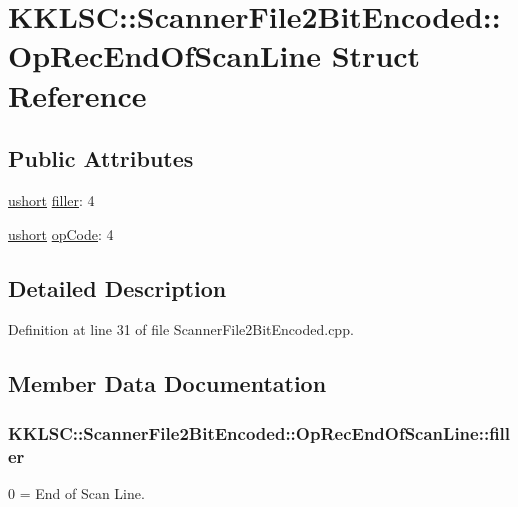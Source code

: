\hypertarget{struct_scanner_file2_bit_encoded_1_1_op_rec_end_of_scan_line}{}\section{K\+K\+L\+SC\+:\+:Scanner\+File2\+Bit\+Encoded\+:\+:Op\+Rec\+End\+Of\+Scan\+Line Struct Reference}
\label{struct_scanner_file2_bit_encoded_1_1_op_rec_end_of_scan_line}
\subsection*{Public Attributes}
\begin{DoxyCompactItemize}
\item 
\hyperlink{namespace_k_k_b_a4a7e2d1bab49f38edf25c38a8dc20012}{ushort} \hyperlink{struct_scanner_file2_bit_encoded_1_1_op_rec_end_of_scan_line_a22b8f824b1699e0f81839347a4eb8ab0}{filler}\+: 4
\item 
\hyperlink{namespace_k_k_b_a4a7e2d1bab49f38edf25c38a8dc20012}{ushort} \hyperlink{struct_scanner_file2_bit_encoded_1_1_op_rec_end_of_scan_line_af6520848e4cad452f8292a689ddb867e}{op\+Code}\+: 4
\end{DoxyCompactItemize}


\subsection{Detailed Description}


Definition at line 31 of file Scanner\+File2\+Bit\+Encoded.\+cpp.



\subsection{Member Data Documentation}
\subsubsection[{\texorpdfstring{filler}{filler}}]{ K\+K\+L\+S\+C\+::\+Scanner\+File2\+Bit\+Encoded\+::\+Op\+Rec\+End\+Of\+Scan\+Line\+::filler}\hypertarget{struct_scanner_file2_bit_encoded_1_1_op_rec_end_of_scan_line_a22b8f824b1699e0f81839347a4eb8ab0}{}\label{struct_scanner_file2_bit_encoded_1_1_op_rec_end_of_scan_line_a22b8f824b1699e0f81839347a4eb8ab0}
0 = End of Scan Line. 

